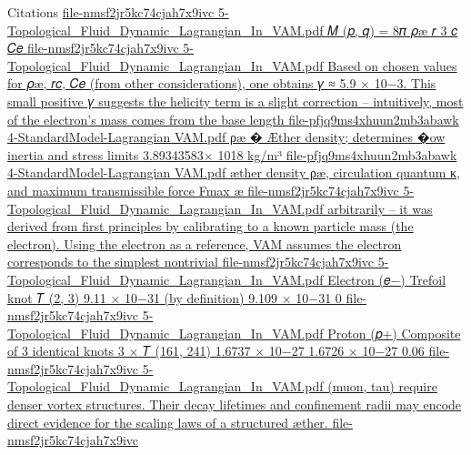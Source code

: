 Citations
\href{file://xn--file-nmsf2jr5kc74cjah7x9ivc%23:~:text=m%20,%20r%203%20c%20ce-9df5346b/}{file-nmsf2jr5kc74cjah7x9ivc
5-Topological_Fluid_Dynamic_Lagrangian_In_VAM.pdf
𝑀 (𝑝, 𝑞) = 8𝜋 𝜌æ 𝑟 3 𝑐 𝐶𝑒
}\href{file://file-nmsf2jr5kc74cjah7x9ivc%23:~:text=based%20on%20chosen%20values%20for,comes%20from%20the%20base%20length/}{file-nmsf2jr5kc74cjah7x9ivc
5-Topological_Fluid_Dynamic_Lagrangian_In_VAM.pdf
Based on chosen values for 𝜌æ, 𝑟𝑐, 𝐶𝑒 (from other considerations), one obtains 𝛾 ≈ 5.9 × 10−3. This small positive 𝛾 suggests the helicity term is a slight correction – intuitively, most of the electron’s mass comes from the base length
}\href{file://file-pfjq9ms4xhuun2mb3abawk%23:~:text=%CF%81%C3%A6%20%EF%BF%BD%20%C3%86ther%20density;%20determines,89343583%C3%97%201018%20kg%2Fm%C2%B3/}{file-pfjq9ms4xhuun2mb3abawk
4-StandardModel-Lagrangian VAM.pdf
ρæ � Æther density; determines �ow inertia and stress limits 3.89343583× 1018 kg/m³
}\href{file://xn--file-pfjq9ms4xhuun2mb3abawk%23:~:text=ther%20density%20,%20circulation%20quantum,maximum%20transmissible%20force%20fmax%20-tjkr1ev568c/}{file-pfjq9ms4xhuun2mb3abawk
4-StandardModel-Lagrangian VAM.pdf
æther density ρæ, circulation quantum κ, and maximum transmissible force Fmax æ
}\href{file://xn--file-nmsf2jr5kc74cjah7x9ivc%23:~:text=arbitrarily%20%20it%20was%20derived,corresponds%20to%20the%20simplest%20nontrivial-up21f/}{file-nmsf2jr5kc74cjah7x9ivc
5-Topological_Fluid_Dynamic_Lagrangian_In_VAM.pdf
arbitrarily – it was derived from first principles by calibrating to a known particle mass (the electron). Using the electron as a reference, VAM assumes the electron corresponds to the simplest nontrivial
}\href{file://xn--file-nmsf2jr5kc74cjah7x9ivc%23:~:text=electron%20,109%20%201031%200-w4e20189c/}{file-nmsf2jr5kc74cjah7x9ivc
5-Topological_Fluid_Dynamic_Lagrangian_In_VAM.pdf
Electron (𝑒−) Trefoil knot 𝑇 (2, 3) 9.11 × 10−31 (by definition) 9.109 × 10−31 0%
}\href{file://file-nmsf2jr5kc74cjah7x9ivc%23:~:text=proton%20,06/}{file-nmsf2jr5kc74cjah7x9ivc
5-Topological_Fluid_Dynamic_Lagrangian_In_VAM.pdf
Proton (𝑝+) Composite of 3 identical knots 3 × 𝑇 (161, 241) 1.6737 × 10−27 1.6726 × 10−27 0.06%
}\href{file://xn--file-nmsf2jr5kc74cjah7x9ivc%23:~:text=,laws%20of%20a%20structured%20ther-yeg/}{file-nmsf2jr5kc74cjah7x9ivc
5-Topological_Fluid_Dynamic_Lagrangian_In_VAM.pdf
(muon, tau) require denser vortex structures. Their decay lifetimes and confinement radii may encode direct evidence for the scaling laws of a structured æther.
}\href{file://xn--file-nmsf2jr5kc74cjah7x9ivc%23:~:text=rest%20energy%20e%20=%20vc-hqf9539b/}{file-nmsf2jr5kc74cjah7x9ivc
}
